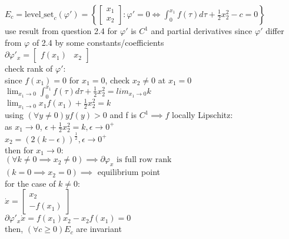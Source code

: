 \documentclass[12pt,letter]{article}
\begin{document}
\begin{itemize}
\begin{enumerate}
      $E_c = \text{level\_set}_{c}(\varphi') = \left\{\begin{bmatrix}x_1 \\ x_2\end{bmatrix}: \varphi'=0 \Longleftrightarrow \int_{0}^{x_1} f(\tau) d \tau + \frac{1}{2}x_2^2-c = 0 \right\}$\\      

      use result from question 2.4 for $\varphi'$ is $C^1$ and partial derivatives since $\varphi'$ differ from $\varphi$ of 2.4 by some constants/coefficients\\
      
      $\partial \varphi'_x = \begin{bmatrix} f(x_1) & x_2\end{bmatrix}$\\

      check rank of $\varphi'$:\\
      
      since $f(x_1)=0$  for $x_1=0$, check $x_2 \neq 0$ at $x_1=0$\\
      $\lim_{x_1\rightarrow 0} \int_{0}^{x_1} f(\tau) d \tau + \frac{1}{2} x_2^2=lim_{x_1\rightarrow 0}k$\\
      $\lim_{x_1\rightarrow 0}x_1 f(x_1) + \frac{1}{2}x_2^2=k$\\
      using $(\forall y \neq 0) y f(y) > 0$ and f is $C^1 \implies f$ locally Lipschitz:\\
      as $x_1 \rightarrow 0$, $\epsilon + \frac{1}{2} x_2^2=k, \epsilon \rightarrow 0^+$\\
      $x_2=(2(k-\epsilon))^{\frac{1}{2}}, \epsilon \rightarrow 0^+$\\

      then for $x_1 \rightarrow 0$:\\
      $(\forall k\neq 0 \implies x_2 \neq 0) \implies \partial \varphi_x \text{ is full row rank}$\\
      $(k=0\implies x_2 = 0) \implies$ equilibrium point\\

      for the case of $k\neq 0$:\\
      $\dot{x}=\begin{bmatrix} x_2 \\ -f(x_1) \end{bmatrix}$\\
      $\partial \varphi'_x \dot{x}=f(x_1)x_2-x_2 f(x_1)=0$\\
      then, $(\forall c \geq 0)E_c$ are invariant\\


\end{enumerate}
\end{itemize}
\end{document}
